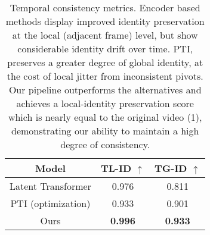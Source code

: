\begin{table}[]
    \centering
\begin{tabular}{c | c | c }
        \toprule
        Model & TL-ID $\uparrow$ & TG-ID $\uparrow$ \\
        \midrule
        Latent Transformer & 0.976 & 0.811 \\
        PTI (optimization) & 0.933 & 0.901 \\
        Ours & \textbf{0.996} & \textbf{0.933} \\
        \bottomrule
\end{tabular}

    \caption{Temporal consistency metrics. Encoder based methods display improved identity preservation at the local (adjacent frame) level, but show considerable identity drift over time. PTI, preserves a greater degree of global identity, at the cost of local jitter from inconsistent pivots. Our pipeline outperforms the alternatives and achieves a local-identity preservation score which is nearly equal to the original video (1), demonstrating our ability to maintain a high degree of consistency.}
    \vspace{-0.35cm}
    \label{tb:temporal_id}
    
\end{table}